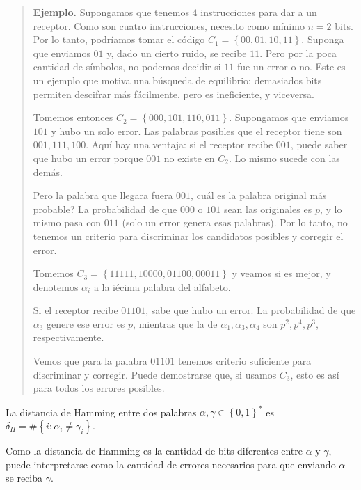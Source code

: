 \documentclass[a4paper]{article}
\begin{document}
\small
\begin{quote}

\textbf{Ejemplo.} Supongamos que tenemos $4$ instrucciones para dar a un
receptor. Como son cuatro instrucciones, necesito como mínimo $n = 2$ bits. Por
lo tanto, podríamos tomar el código $C_1 = \left\{ 00, 01, 10, 11 \right\} $.
Suponga que enviamos $01$ y, dado un cierto ruido, se recibe $11$.
Pero por la poca cantidad de símbolos, no podemos decidir si 
$11$ fue un error o no. Este es un ejemplo que motiva una búsqueda 
de equilibrio: demasiados bits permiten descifrar más fácilmente,
pero es ineficiente, y viceversa. 

Tomemos entonces $C_2 = \left\{ 000, 101, 110, 011 \right\} $. 
Supongamos que enviamos $101$ y hubo un solo error.
Las palabras posibles que el receptor tiene son $001, 111, 100$.
Aquí hay una ventaja: si el receptor recibe $001$, puede saber 
que hubo un error porque $001$ no existe en $C_2$. Lo mismo 
sucede con las demás.

Pero la palabra que llegara fuera $001$, cuál es la palabra 
original más probable? La probabilidad de que $000$ o $101$
sean las originales es $p$, y lo mismo pasa con $011$ (solo 
un error genera esas palabras). Por lo tanto, no tenemos 
un criterio para discriminar los candidatos posibles y corregir el error.

Tomemos $C_3 = \left\{ 11111, 10000, 01100, 00011 \right\} $ y veamos 
si es mejor, y denotemos $\alpha_i$ a la iécima palabra 
del alfabeto. 

Si el receptor recibe $01101$, sabe que hubo un error. La probabilidad de que
$\alpha_3$ genere ese error es $p$, mientras que la de $\alpha_1, \alpha_3,
\alpha_4$ son $p^2, p^4, p^3$, respectivamente. 

Vemos que para la palabra $01101$ tenemos criterio suficiente para 
discriminar y corregir. Puede demostrarse que, si usamos $C_3$, esto es así
para todos los errores posibles.

\end{quote}
\normalsize

\begin{definition}
    La distancia de Hamming entre dos palabras $\alpha, \gamma \in \left\{ 0, 1 \right\}^{*} $
    es $\delta_{H} = \# \left\{ i : \alpha_i \neq \gamma_i \right\} $.
\end{definition}

Como la distancia de Hamming es la cantidad de bits diferentes entre $\alpha$ y
$\gamma$, puede interpretarse como la cantidad de errores necesarios para que
enviando $\alpha$ se reciba $\gamma$.
\end{document}
